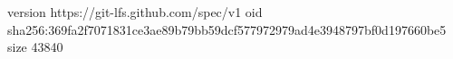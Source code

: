 version https://git-lfs.github.com/spec/v1
oid sha256:369fa2f7071831ce3ae89b79bb59dcf577972979ad4e3948797bf0d197660be5
size 43840
